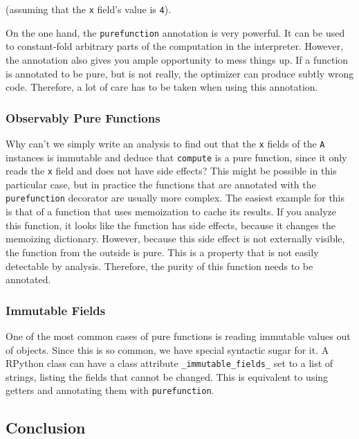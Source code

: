 \documentclass{sig-alternate}
\begin{document}
(assuming that the \texttt{x} field's value is \texttt{4}).

On the one hand, the \texttt{purefunction} annotation is very powerful. It can be
used to constant-fold arbitrary parts of the computation in the interpreter.
However, the annotation also gives you ample opportunity to mess things up. If a
function is annotated to be pure, but is not really, the optimizer can produce
subtly wrong code. Therefore, a lot of care has to be taken when using this
annotation.


\subsubsection{Observably Pure Functions}

Why can't we simply write an analysis to find out that the \texttt{x} fields of the
\texttt{A} instances is immutable and deduce that \texttt{compute} is a pure function,
since it only reads the \texttt{x} field and does not have side effects? This might
be possible in this particular case, but in practice the functions that are
annotated with the \texttt{purefunction} decorator are usually more complex.
The easiest example for this is that of a function that uses memoization to
cache its results. If you analyze this function, it looks like the function has
side effects, because it changes the memoizing dictionary. However, because this side
effect is not externally visible, the function from the outside is pure. This is
a property that is not easily detectable by analysis. Therefore, the purity
of this function needs to be annotated.



\subsubsection{Immutable Fields}

One of the most common cases of pure functions is reading immutable
values out of objects. Since this is so common, we have special syntactic sugar
for it. A RPython class can have a class attribute \texttt{\_immutable\_fields\_} set to
a list of strings, listing the fields that cannot be changed. This is equivalent
to using getters and annotating them with \texttt{purefunction}.



\subsection{Conclusion}
\end{document}
